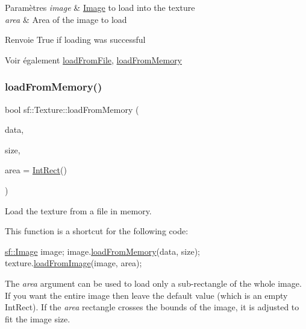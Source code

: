 \begin{DoxyParams}{Paramètres}
{\em image} & \hyperlink{classsf_1_1Image}{Image} to load into the texture \\
\hline
{\em area} & Area of the image to load\\
\hline
\end{DoxyParams}
\begin{DoxyReturn}{Renvoie}
True if loading was successful
\end{DoxyReturn}
\begin{DoxySeeAlso}{Voir également}
\hyperlink{classsf_1_1Texture_a8e1b56eabfe33e2e0e1cb03712c7fcc7}{load\+From\+File}, \hyperlink{classsf_1_1Texture_a2c4adb19dd4cbee0a588eeb85e52a249}{load\+From\+Memory} 
\end{DoxySeeAlso}
\mbox{\label{classsf_1_1Texture_a2c4adb19dd4cbee0a588eeb85e52a249}} 
\subsubsection{\texorpdfstring{load\+From\+Memory()}{loadFromMemory()}}
{\footnotesize\ttfamily bool sf\+::\+Texture\+::load\+From\+Memory (\begin{DoxyParamCaption}\item[{const void $\ast$}]{data,  }\item[{std\+::size\+\_\+t}]{size,  }\item[{const \hyperlink{classsf_1_1Rect}{Int\+Rect} \&}]{area = {\ttfamily \hyperlink{classsf_1_1Rect}{Int\+Rect}()} }\end{DoxyParamCaption})}



Load the texture from a file in memory. 

This function is a shortcut for the following code\+: 
\begin{DoxyCode}
\hyperlink{classsf_1_1Image}{sf::Image} image;
image.\hyperlink{classsf_1_1Image_aaa6c7afa5851a51cec6ab438faa7354c}{loadFromMemory}(data, size);
texture.\hyperlink{classsf_1_1Texture_abec4567ad9856a3596dc74803f26fba2}{loadFromImage}(image, area);
\end{DoxyCode}


The {\itshape area} argument can be used to load only a sub-\/rectangle of the whole image. If you want the entire image then leave the default value (which is an empty Int\+Rect). If the {\itshape area} rectangle crosses the bounds of the image, it is adjusted to fit the image size.

